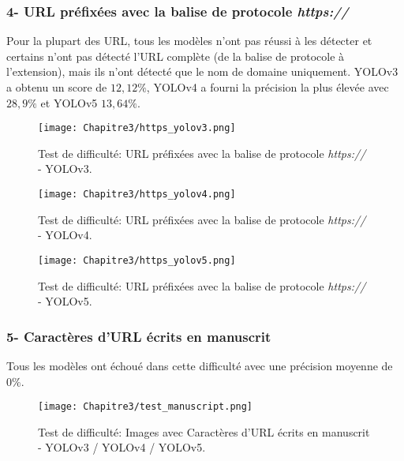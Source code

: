           \subsubsection{4- URL préfixées avec la balise de protocole \textit{https://}}
          Pour la  plupart des URL, tous les modèles n'ont pas réussi à les détecter et certains n'ont pas détecté l'URL complète (de la balise de protocole à l'extension), mais ils n'ont détecté que le nom de domaine uniquement.
          YOLOv3 a obtenu un score de $12,12\%$, YOLOv4 a fourni la précision la plus élevée avec $28,9\%$ et YOLOv5 $13,64\%$.
          \begin{figure}[H]
               \centering
                \texttt{[image: Chapitre3/https\_yolov3.png]}
                \caption{Test de difficulté: URL préfixées avec la balise de protocole \textit{https://} - YOLOv3.}
                \label{y3_t4}
                \end{figure}
          \begin{figure}[H]
                    \centering
                    \texttt{[image: Chapitre3/https\_yolov4.png]}
                    \caption{Test de difficulté: URL préfixées avec la balise de protocole \textit{https://} - YOLOv4.}
                    \label{y4_https}
                    \end{figure}
          \begin{figure}[H]
                    \centering
                    \texttt{[image: Chapitre3/https\_yolov5.png]}
                    \caption{Test de difficulté: URL préfixées avec la balise de protocole \textit{https://} - YOLOv5.}
                    \label{y5_https}
                    \end{figure}

          \subsubsection{5- Caractères d'URL écrits en manuscrit}
          Tous les modèles ont échoué dans cette difficulté avec une précision moyenne de $0\%$.
          \begin{figure}[H]
                    \centering
                    \texttt{[image: Chapitre3/test\_manuscript.png]}
                    \caption{Test de difficulté: Images avec Caractères d'URL écrits en manuscrit - YOLOv3 / YOLOv4 / YOLOv5.}
                    \label{test_manuscrit}
                    \end{figure}

